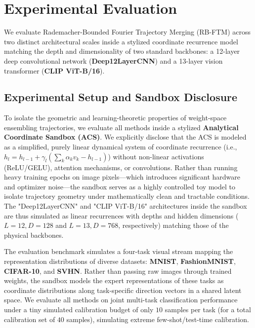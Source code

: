 \section{Experimental Evaluation}
\label{sec:experiments}

We evaluate Rademacher-Bounded Fourier Trajectory Merging (RB-FTM) across two distinct architectural scales inside a stylized coordinate recurrence model matching the depth and dimensionality of two standard backbones: a 12-layer deep convolutional network (\textbf{Deep12LayerCNN}) and a 13-layer vision transformer (\textbf{CLIP ViT-B/16}).

\subsection{Experimental Setup and Sandbox Disclosure}
To isolate the geometric and learning-theoretic properties of weight-space ensembling trajectories, we evaluate all methods inside a stylized \textbf{Analytical Coordinate Sandbox (ACS)}. We explicitly disclose that the ACS is modeled as a simplified, purely linear dynamical system of coordinate recurrence (i.e., $h_l = h_{l-1} + \gamma_l (\sum_k \alpha_k v_k - h_{l-1})$) without non-linear activations (ReLU/GELU), attention mechanisms, or convolutions. Rather than running heavy training epochs on image pixels—which introduces significant hardware and optimizer noise—the sandbox serves as a highly controlled toy model to isolate trajectory geometry under mathematically clean and tractable conditions. The "Deep12LayerCNN" and "CLIP ViT-B/16" architectures inside the sandbox are thus simulated as linear recurrences with depths and hidden dimensions ($L=12, D=128$ and $L=13, D=768$, respectively) matching those of the physical backbones.

The evaluation benchmark simulates a four-task visual stream mapping the representation distributions of diverse datasets: \textbf{MNIST}, \textbf{FashionMNIST}, \textbf{CIFAR-10}, and \textbf{SVHN}. Rather than passing raw images through trained weights, the sandbox models the expert representations of these tasks as coordinate distributions along task-specific direction vectors in a shared latent space. We evaluate all methods on joint multi-task classification performance under a tiny simulated calibration budget of only $10$ samples per task (for a total calibration set of $40$ samples), simulating extreme few-shot/test-time calibration.

